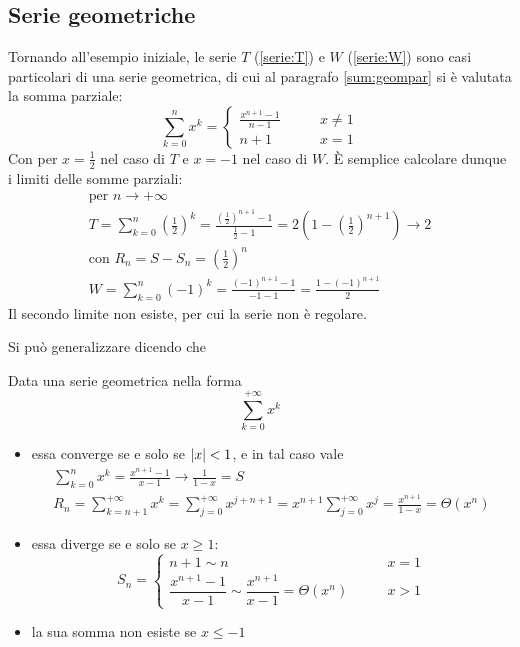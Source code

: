 \subsection{Serie geometriche}
Tornando all'esempio iniziale, le serie $T$ (\ref{serie:T}) e $W$ (\ref{serie:W}) sono casi particolari di una serie geometrica, di cui al paragrafo \ref{sum:geompar} si è valutata la somma parziale:
\[
	\sum_{k=0}^n x^k=
	\begin{cases}
		\frac{x^{n+1}-1}{n-1}\qquad & x\neq1 \\
		n+1\qquad                   & x=1
	\end{cases}
\]
Con per $x=\frac{1}{2}$ nel caso di $T$ e $x=-1$ nel caso di $W$. È semplice calcolare dunque i limiti delle somme parziali:
\begin{gather*}
	\text{per }n\to+\infty\\
	T=\sum_{k=0}^n \left(\frac{1}{2}\right)^k=\frac{\left(\frac{1}{2}\right)^{n+1}-1}{\frac{1}{2}-1}=2\left(1-\left(\frac{1}{2}\right)^{n+1}\right)\to2\\
	\text{con }R_n=S-S_n=\left(\frac{1}{2}\right)^n\\
	W=\sum_{k=0}^n (-1)^k=\frac{(-1)^{n+1}-1}{-1-1}=\frac{1-(-1)^{n+1}}{2}
\end{gather*}
Il secondo limite non esiste, per cui la serie non è regolare.

Si può generalizzare dicendo che
\begin{prop}
	Data una serie geometrica nella forma
	\[
		\sum_{k=0}^{+\infty} x^k
	\]
	\begin{itemize}
		\item essa converge se e solo se $\left\lvert x \right\rvert<1$, e in tal caso vale
		      \begin{gather}
			      \sum_{k=0}^n x^k = \frac{x^{n+1}-1}{x-1}\to\frac{1}{1-x}=S\\
			      R_n=\sum_{k=n+1}^{+\infty} x^k=\sum_{j=0}^{+\infty} x^{j+n+1} = x^{n+1}\sum_{j=0}^{+\infty} x^j=\frac{x^{n+1}}{1-x}=\Theta(x^n)
		      \end{gather}
		\item essa diverge se e solo se $x\geq1$:
		      \[
			      S_n=
			      \begin{cases}
				      n+1\sim n\qquad                                                  & x=1 \\[1ex]
				      \dfrac{x^{n+1}-1}{x-1}\sim\dfrac{x^{n+1}}{x-1}=\Theta(x^n)\qquad & x>1
			      \end{cases}
		      \]
		\item la sua somma non esiste se $x\leq-1$
	\end{itemize}
\end{prop}

